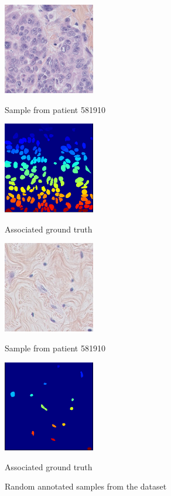 \documentclass{article}
\begin{document}
\begin{figure}[htb]
%
%
\begin{minipage}[b]{.48\linewidth}
  \centering
  \centerline{\includegraphics[width=4.0cm]{RGB_2}}
  \centerline{Sample from patient 581910}\medskip
\end{minipage}
\hfill
\begin{minipage}[b]{0.48\linewidth}
  \centering
  \centerline{\includegraphics[width=4.0cm]{GT_2}}
  \centerline{Associated ground truth}\medskip
\end{minipage}
%
%
\begin{minipage}[b]{.48\linewidth}
  \centering
  \centerline{\includegraphics[width=4.0cm]{RGB_3}}
  \centerline{Sample from patient 581910}\medskip
\end{minipage}
\hfill
\begin{minipage}[b]{0.48\linewidth}
  \centering
  \centerline{\includegraphics[width=4.0cm]{GT_3}}
  \centerline{Associated ground truth}\medskip
\end{minipage}
%
\caption{Random annotated samples from the dataset}
\label{fig:annotation}
%
\end{figure}
\end{document}
